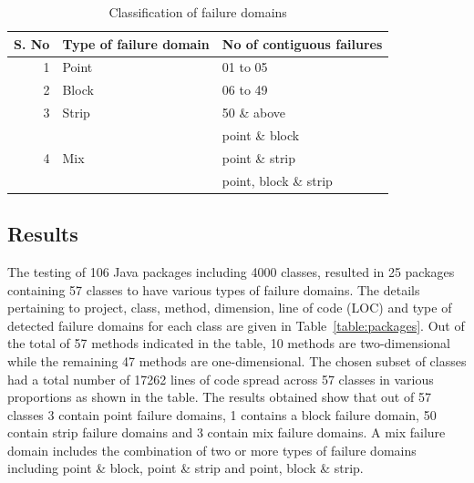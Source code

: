 \begin{table}[h]
\scriptsize
\caption{Classification of failure domains} 
\bigskip
\centering
{\renewcommand{\arraystretch}{1.5}
\begin{tabular}{| r | l | l |} 
\hline 
S. No 	&	Type of failure domain						& No of contiguous failures	 \\
				  
				 
				 
				 
\hline 
1		&	Point										 & 01 to 05							\\
\hline 
2		& 	Block										 & 06 to 49							\\
\hline 
3		&	Strip 										 & 50 \& above						 \\ 
\hline 
		&				 								 & point \& block						\\
4		& 	Mix											 & point \& strip 						\\
		&											        & point, block \& strip				\\
\hline
\end{tabular}
}
\label{table:resultsSummary} %
\end{table}
\bigskip
\bigskip


\subsection{Results}
The testing of 106 Java packages including 4000 classes, resulted in 25 packages containing 57 classes to have various types of failure domains. The details pertaining to project, class, method, dimension, line of code (LOC) and type of detected failure domains for each class are given in Table~\ref{table:packages}. Out of the total of 57 methods indicated in the table, 10 methods are two-dimensional while the remaining 47 methods are one-dimensional. The chosen subset of classes had a total number of 17262 lines of code spread across 57 classes in various proportions as shown in the table. The results obtained show that out of 57 classes 3 contain point failure domains, 1 contains a block failure domain, 50 contain strip failure domains and 3 contain mix failure domains. A mix failure domain includes the combination of two or more types of failure domains including point \& block, point \& strip and point, block \& strip. 



